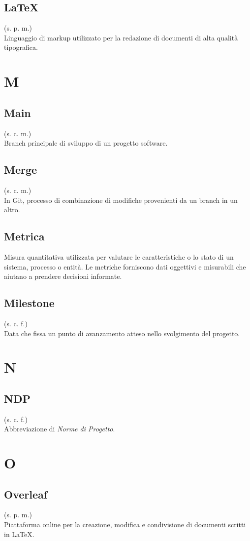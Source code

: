     \subsection{LaTeX}
    \label{LaTeX}
    (s. p. m.)\\
    Linguaggio di markup utilizzato per la redazione di documenti di alta qualità tipografica.
\pagebreak
\section{M}
    \subsection{Main}
    (s. c. m.)\\
    Branch principale di sviluppo di un progetto software.
    \subsection{Merge}
    (s. c. m.)\\
    In Git, processo di combinazione di modifiche provenienti da un branch in un altro.
    \subsection{Metrica}
    Misura quantitativa utilizzata per valutare le caratteristiche o lo stato di un sistema, processo o entità. 
    Le metriche forniscono dati oggettivi e misurabili che aiutano a prendere decisioni informate.
    \subsection{Milestone}
    (s. c. f.)\\
    Data che fissa un punto di avanzamento atteso nello svolgimento del progetto.
    \pagebreak
\section{N}
\subsection{NDP}
    (s. c. f.)\\
    Abbreviazione di \textit{Norme di Progetto}.
\pagebreak
\section{O}
    \subsection{Overleaf}
    (s. p. m.)\\
    Piattaforma online per la creazione, modifica e condivisione di documenti 
    scritti in LaTeX.
\pagebreak

